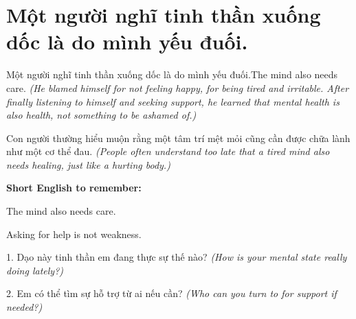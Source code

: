 \section{Một người nghĩ tinh thần xuống dốc là do mình yếu đuối.}
\begin{truyen}{Một người nghĩ tinh thần xuống dốc là do mình yếu đuối.}{The mind also needs care.}
\textit{(He blamed himself for not feeling happy, for being tired and irritable. After finally listening to himself and seeking support, he learned that mental health is also health, not something to be ashamed of.)}
\end{truyen}
\begin{baihoc}
Con người thường hiểu muộn rằng một tâm trí mệt mỏi cũng cần được chữa lành như một cơ thể đau.
\textit{(People often understand too late that a tired mind also needs healing, just like a hurting body.)}
\end{baihoc}
\begin{ghinhoanh}
\textbf{Short English to remember:}

The mind also needs care.

Asking for help is not weakness.
\end{ghinhoanh}
\begin{tuhocnhanh}
1. Dạo này tinh thần em đang thực sự thế nào? \textit{(How is your mental state really doing lately?)}

2. Em có thể tìm sự hỗ trợ từ ai nếu cần? \textit{(Who can you turn to for support if needed?)}
\end{tuhocnhanh}
\ngancach